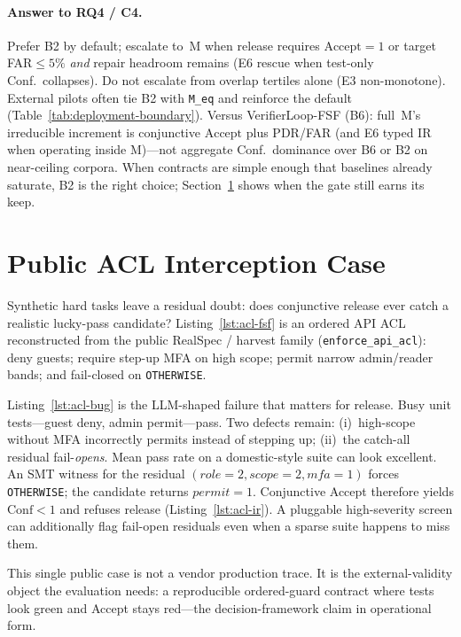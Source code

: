 \paragraph{Answer to RQ4 / C4.}
Prefer B2 by default; escalate to~M when release requires
$\mathrm{Accept}{=}1$ or target FAR${\le}5\%$ \emph{and} repair headroom
remains (E6 rescue when test-only Conf.\ collapses).
Do not escalate from overlap tertiles alone (E3 non-monotone).
External pilots often tie B2 with \texttt{M\_eq} and reinforce the default
(Table~\ref{tab:deployment-boundary}).
Versus VerifierLoop-FSF (B6): full~M's irreducible increment is conjunctive
$\mathrm{Accept}$ plus PDR/FAR (and E6 typed IR when operating inside M)---not
aggregate Conf.\ dominance over B6 or B2 on near-ceiling corpora.
When contracts are simple enough that baselines already saturate, B2 is the
right choice; Section~\ref{sec:results:acl-case} shows when the gate still
earns its keep.

\section{Public ACL Interception Case}
\label{sec:results:acl-case}

Synthetic hard tasks leave a residual doubt: does conjunctive release ever
catch a realistic lucky-pass candidate?
Listing~\ref{lst:acl-fsf} is an ordered API ACL reconstructed from the
public RealSpec / harvest family (\texttt{enforce\_api\_acl}): deny guests;
require step-up MFA on high scope; permit narrow admin/reader bands; and
fail-closed on \texttt{OTHERWISE}.

Listing~\ref{lst:acl-bug} is the LLM-shaped failure that matters for release.
Busy unit tests---guest deny, admin permit---pass.
Two defects remain: (i)~high-scope without MFA incorrectly permits instead of
stepping up; (ii)~the catch-all residual fail-\emph{opens}.
Mean pass rate on a domestic-style suite can look excellent.
An SMT witness for the residual
$(\mathit{role}{=}2,\mathit{scope}{=}2,\mathit{mfa}{=}1)$ forces
\texttt{OTHERWISE}; the candidate returns $\mathit{permit}{=}1$.
Conjunctive Accept therefore yields $\mathrm{Conf}<1$ and refuses release
(Listing~\ref{lst:acl-ir}).
A pluggable high-severity screen can additionally flag fail-open residuals
even when a sparse suite happens to miss them.

This single public case is not a vendor production trace.
It is the external-validity object the evaluation needs: a reproducible
ordered-guard contract where tests look green and Accept stays red---the
decision-framework claim in operational form.

